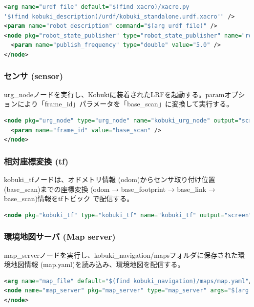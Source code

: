 \begin{lstlisting}[language=XML]
<arg name="urdf_file" default="$(find xacro)/xacro.py
'$(find kobuki_description)/urdf/kobuki_standalone.urdf.xacro'" />
<param name="robot_description" command="$(arg urdf_file)" />
<node pkg="robot_state_publisher" type="robot_state_publisher" name="robot_state_publisher" output="screen">
  <param name="publish_frequency" type="double" value="5.0" />
</node>
\end{lstlisting}

\subsubsection{センサ (sensor)}

urg\_nodeノードを実行し、Kobukiに装着されたLRFを起動する。paramオプションにより「frame\_id」パラメータを「base\_scan」に変換して実行する。

\begin{lstlisting}[language=XML]
<node pkg="urg_node" type="urg_node" name="kobuki_urg_node" output="screen">
  <param name="frame_id" value="base_scan" />
</node>
\end{lstlisting}

\subsubsection{相対座標変換 (tf)}

kobuki\_tfノードは、オドメトリ情報 (odom)からセンサ取り付け位置 (base\_scan)までの座標変換 (odom → base\_footprint → base\_link → base\_scan)情報をtfトピック  で配信する。

\begin{lstlisting}[language=XML]
<node pkg="kobuki_tf" type="kobuki_tf" name="kobuki_tf" output="screen"> </node>
\end{lstlisting}

\subsubsection{環境地図サーバ (Map server)}

map\_serverノードを実行し、kobuki\_navigation/mapsフォルダに保存された環境地図情報 (map.yaml)を読み込み、環境地図を配信する。

\begin{lstlisting}[language=XML]
<arg name="map_file" default="$(find kobuki_navigation)/maps/map.yaml"/>
<node name="map_server" pkg="map_server" type="map_server" args="$(arg map_file)">
</node>
\end{lstlisting}

